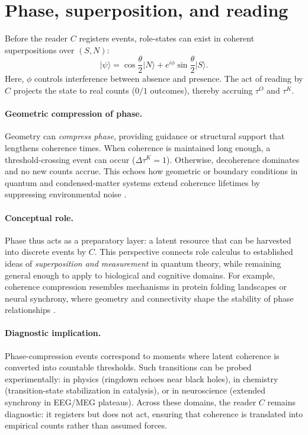 \documentclass[12pt,a4paper,oneside]{scrreprt}
\begin{document}
\section{Phase, superposition, and reading}\label{sec:ur-phase}

Before the reader $C$ registers events, role-states can exist in coherent superpositions over $(S,N)$:
\[
\lvert \psi \rangle 
= \cos\frac{\theta}{2}\lvert N \rangle 
+ e^{i\phi}\sin\frac{\theta}{2}\lvert S \rangle.
\]
Here, $\phi$ controls interference between absence and presence. 
The act of reading by $C$ projects the state to real counts ($0/1$ outcomes), thereby accruing $\tau^O$ and $\tau^K$. 

\paragraph{Geometric compression of phase.} 
Geometry can \emph{compress phase}, providing guidance or structural support that lengthens coherence times. 
When coherence is maintained long enough, a threshold-crossing event can occur ($\Delta\tau^K = 1$). 
Otherwise, decoherence dominates and no new counts accrue. 
This echoes how geometric or boundary conditions in quantum and condensed-matter systems extend coherence lifetimes by suppressing environmental noise \citep{Zurek2003Decoherence}.

\paragraph{Conceptual role.} 
Phase thus acts as a preparatory layer: a latent resource that can be harvested into discrete events by $C$. 
This perspective connects role calculus to established ideas of \emph{superposition and measurement} in quantum theory, while remaining general enough to apply to biological and cognitive domains. 
For example, coherence compression resembles mechanisms in protein folding landscapes or neural synchrony, where geometry and connectivity shape the stability of phase relationships \citep{Tegmark2000Importance,Friston2010FEP}.

\paragraph{Diagnostic implication.} 
Phase-compression events correspond to moments where latent coherence is converted into countable thresholds. 
Such transitions can be probed experimentally: in physics (ringdown echoes near black holes), in chemistry (transition-state stabilization in catalysis), or in neuroscience (extended synchrony in EEG/MEG plateaus). 
Across these domains, the reader $C$ remains diagnostic: it registers but does not act, ensuring that coherence is translated into empirical counts rather than assumed forces.
\end{document}
